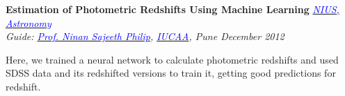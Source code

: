 \documentclass[margin,line]{res}
\newenvironment{list1}{
  \begin{list}{\ding{113}}{%
      \setlength{\itemsep}{0in}
      \setlength{\parsep}{0in} \setlength{\parskip}{0in}
      \setlength{\topsep}{0in} \setlength{\partopsep}{0in} 
      \setlength{\leftmargin}{0.17in}}}{\end{list}}
\begin{document}
\begin{resume}
\vspace*{-0.13in}

{\bf Estimation of Photometric Redshifts Using Machine Learning} \hfill \textit{\href{http://nius.hbcse.tifr.res.in/}{\textcolor{blue} {NIUS, Astronomy}}} \\
{\em Guide: \href{http://www.iucaa.ernet.in/~nspp/}{\textcolor{blue}{Prof. Ninan Sajeeth Philip}}, \href{http://www.iucaa.ernet.in/}{\textcolor{blue} {IUCAA}}, Pune \hfill December 2012} \\
\vspace*{-.15in}
\begin{list1}
\item[] Here, we trained a neural network to calculate photometric redshifts and used SDSS data and its redshifted versions to train it, getting good predictions for redshift.
\end{list1}

\vspace*{-0.13in}


\end{resume}
\end{document}
